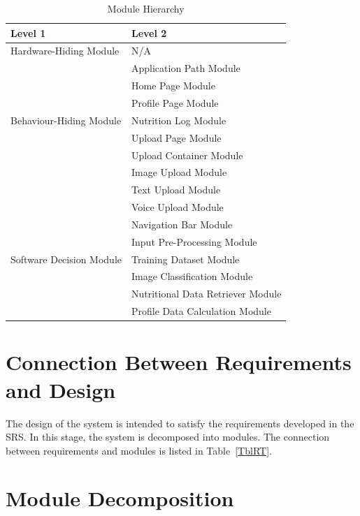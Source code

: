 \documentclass[12pt, titlepage]{article}
\begin{document}
\begin{table}[H]
\centering
\begin{tabular}{p{} p{}}
\toprule
\textbf{Level 1} & \textbf{Level 2}\\
\midrule

{Hardware-Hiding Module} & N/A \\
\midrule

\multirow{7}{0.3\textwidth}{Behaviour-Hiding Module} & Application Path Module\\
& Home Page Module\\
& Profile Page Module\\
& Nutrition Log Module\\
& Upload Page Module\\
& Upload Container Module \\
& Image Upload Module\\
& Text Upload Module \\
& Voice Upload Module \\
& Navigation Bar Module\\ 
\midrule

\multirow{3}{0.3\textwidth}{Software Decision Module} & Input Pre-Processing Module\\
& Training Dataset Module\\
& Image Classification Module\\
& Nutritional Data Retriever Module\\
& Profile Data Calculation Module\\
\bottomrule

\end{tabular}
\caption{Module Hierarchy}
\label{TblMH}
\end{table}

\section{Connection Between Requirements and Design} \label{SecConnection}

The design of the system is intended to satisfy the requirements developed in
the SRS. In this stage, the system is decomposed into modules. The connection
between requirements and modules is listed in Table~\ref{TblRT}.

\section{Module Decomposition} \label{SecMD}
\end{document}
